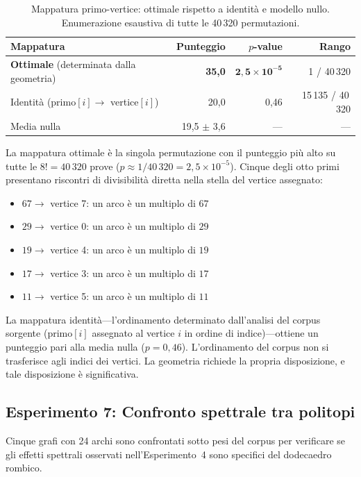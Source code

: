\documentclass[11pt]{article}
\begin{document}
\begin{table}[H]
\centering
\caption{Mappatura primo-vertice: ottimale rispetto a identit\`a e
  modello nullo. Enumerazione esaustiva di tutte le 40\,320
  permutazioni.}
\label{tab:exp6}
\begin{tabular}{lrrr}
\toprule
Mappatura & Punteggio & $p$-value & Rango \\
\midrule
\textbf{Ottimale} (determinata dalla geometria) & \textbf{35,0} & $\mathbf{2{,}5 \times 10^{-5}}$ & 1 / 40\,320 \\
Identit\`a (primo$[i] \to$ vertice$[i]$) & 20,0 & 0,46 & 15\,135 / 40\,320 \\
Media nulla & 19,5 $\pm$ 3,6 & --- & --- \\
\bottomrule
\end{tabular}
\end{table}

La mappatura ottimale \`e la singola permutazione con il punteggio
pi\`u alto su tutte le $8! = 40\,320$ prove
($p \approx 1/40\,320 = 2{,}5 \times 10^{-5}$). Cinque degli otto primi
presentano riscontri di divisibilit\`a diretta nella stella del vertice
assegnato:
\begin{itemize}
  \item $67 \to$ vertice 7: un arco è un multiplo di $67$
  \item $29 \to$ vertice 0: un arco è un multiplo di $29$
  \item $19 \to$ vertice 4: un arco è un multiplo di $19$
  \item $17 \to$ vertice 3: un arco è un multiplo di $17$
  \item $11 \to$ vertice 5: un arco è un multiplo di $11$
\end{itemize}

La mappatura identit\`a---l'ordinamento determinato dall'analisi del
corpus sorgente (primo$[i]$ assegnato al vertice $i$ in ordine di
indice)---ottiene un punteggio pari alla media nulla ($p = 0{,}46$).
L'ordinamento del corpus non si trasferisce agli indici dei vertici.
La geometria richiede la propria disposizione, e tale disposizione \`e
significativa.

\subsection{Esperimento 7: Confronto spettrale tra politopi}

Cinque grafi con 24 archi sono confrontati sotto pesi del corpus per
verificare se gli effetti spettrali osservati nell'Esperimento~4 sono
specifici del dodecaedro rombico.
\end{document}
